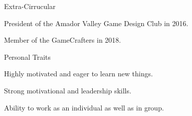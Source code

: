 \documentclass{resume} %
\begin{document}
\begin{rSection}{Extra-Cirrucular} \itemsep -3pt
\item President of the Amador Valley Game Design Club in 2016.
\item Member of the GameCrafters in 2018.
\end{rSection}

\begin{rSection}{Personal Traits}
\item Highly motivated and eager to learn new things.
\item Strong motivational and leadership skills.
\item Ability to work as an individual as well as in group.
\end{rSection}
\end{document}
